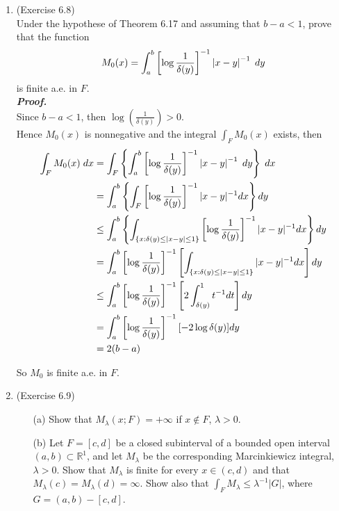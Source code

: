 \documentclass[a4paper,11pt]{article}
\begin{document}
\begin{enumerate}
 	\item (Exercise 6.8)\\
 		Under the hypothese of Theorem 6.17 and assuming that $b - a < 1$, prove that the function
 		$$M_0(x) = \int_a^b \left[ \log \frac{1}{\delta (y)}\right]^{-1} \left| x - y \right|^{-1} \hspace{0.1cm} dy$$
 		is finite a.e. in $F$.\\
 	
 		\textit{\textbf {Proof.}}\\

 		Since $b - a < 1$, then $\log (\frac{1}{\delta(y)}) > 0$.\\
 		Hence $M_0 (x)$ is nonnegative and the integral $\int_F M_0 (x)$ exists, then
 		$$\begin{aligned}
 		\int_F M_0(x) \hspace{0.1cm} dx
 		&= \int_F \left\{ \int_a^b \left[ \log \frac{1}{\delta (y)}\right]^{-1} \left| x - y \right|^{-1} \hspace{0.1cm} dy \right\} \hspace{0.1cm} dx\\
 		&= \int_a^b \left\{ \int_F \left[ \log \frac{1}{\delta(y)} \right]^{-1} |x-y|^{-1} dx \right\} dy\\
 		&\leq \int_a^b \left\{ \int_{\{ x:\delta(y) \leq |x - y| \leq 1 \}} \left[ \log \frac{1}{\delta(y)} \right]^{-1} |x-y|^{-1} dx \right\} dy\\
 		&= \int_a^b \left[ \log \frac{1}{\delta(y)} \right]^{-1} \left[ \int_{\{ x:\delta(y) \leq |x - y| \leq 1 \}} |x-y|^{-1} dx \right] dy\\
 		&\leq \int_a^b \left[ \log \frac{1}{\delta(y)} \right]^{-1} \left[ 2 \int_{\delta(y)}^1 t^{-1} dt \right] dy\\
 		&= \int_a^b \left[ \log \frac{1}{\delta(y)} \right]^{-1} [-2 \log \delta (y)] dy\\
 		&= 2 (b-a)
 		\end{aligned}$$

 		So $M_0$ is finite a.e. in $F$.\\





 	\item (Exercise 6.9)
 		\begin{enumerate}
 			\item [(a)] Show that $M_{\lambda} (x;F) = +\infty$ if $x \notin F$, $\lambda > 0$.

 			\item [(b)] Let $F = [c,d]$ be a closed subinterval of a bounded open interval $(a,b) \subset \mathbb{R}^1$, and let $M_{\lambda}$ be the corresponding Marcinkiewicz integral, $\lambda > 0$. Show that $M_{\lambda}$ is finite for every $x \in (c,d)$ and that $M_{\lambda}(c) = M_{\lambda}(d) = \infty$. Show also that $\int_F M_{\lambda} \leq \lambda^{-1} |G|$, where $G = (a,b) - [c,d]$.
 		\end{enumerate}
 	

\end{enumerate}
\end{document}
